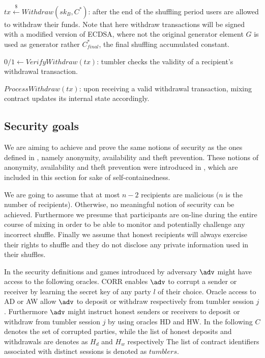 \documentclass[a4paper]{article}
\theoremstyle{definition}
\begin{document}
$tx\stackrel{\$}{\leftarrow}Withdraw(sk_B, C^{*})$: after the end of the shuffling period users are allowed to withdraw their funds. Note that here withdraw transactions will be signed with a modified version of ECDSA, where not the original generator element $G$ is used as generator rather $C^{*}_{final}$, the final shuffling accumulated constant.

$0/1\leftarrow VerifyWithdraw(tx)$: tumbler checks the validity of a recipient's withdrawal transaction.

$ProcessWithdraw(tx)$: upon receiving a valid withdrawal transaction, mixing contract updates its internal state accordingly.

\subsection{Security goals} \label{securitygoals}
We are aiming to achieve and prove the same notions of security as the ones defined in \cite{meiklejohn2018mobius}, namely anonymity, availability and theft prevention. These notions of anonymity, availability and theft prevention were introduced in \cite{meiklejohn2018mobius}, which are included in this section for sake of self-containedness.

We are going to assume that at most $n-2$ recipients are malicious ($n$ is the number of recipients). Otherwise, no meaningful notion of security can be achieved. Furthermore we presume that participants are on-line during the entire course of mixing in order to be able to monitor and potentially challenge any incorrect shuffle. Finally we assume that honest recipients will always exercise their rights to shuffle and they do not disclose any private information used in their shuffles.

In the security definitions and games introduced by \cite{meiklejohn2018mobius} adversary $\adv$ might have access to the following oracles. CORR enables $\adv$ to corrupt a sender or receiver by learning the secret key of any party $l$ of their choice. Oracle access to AD or AW allow $\adv$ to deposit or withdraw respectively from tumbler session $j$. Furthermore $\adv$ might instruct honest senders or receivers to deposit or withdraw from tumbler session $j$ by using oracles HD and HW. In the following $C$ denotes the set of corrupted parties, while the list of honest deposits and withdrawals are denotes as $H_{d}$ and $H_{w}$ respectively The list of contract identifiers associated with distinct sessions is denoted as $tumblers$.     
\end{document}
